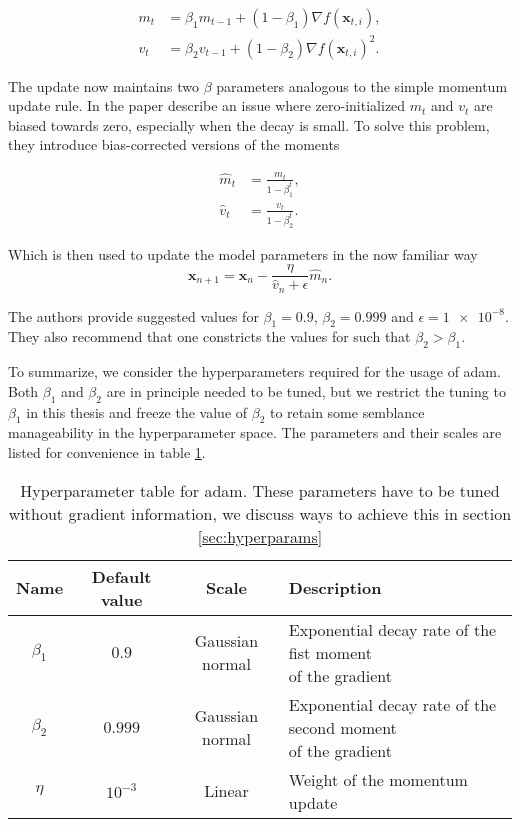 \begin{align}
m_t &= \beta_1 m_{t-1} +(1-\beta_1)\nabla f(\boldsymbol{x}_{t, i}), \\
v_t &= \beta_2 v_{t-1} +(1-\beta_2)\nabla f(\boldsymbol{x}_{t, i})^2.
\end{align}

\noindent The update now maintains two $\beta$ parameters analogous to the simple momentum update rule. In the paper \citet{Kingma2015} describe an issue where zero-initialized $m_t$ and $v_t$ are biased towards zero, especially when the decay is small. To solve this problem, they introduce bias-corrected versions of the moments 

\begin{align}
\hat{m}_t &= \frac{m_t}{1 - \beta_1^t}, \\
\hat{v}_t &= \frac{v_t}{1 - \beta_2^t}.
\end{align}

\noindent Which is then used to update the model parameters in the now familiar way
\begin{equation}\label{eq:adam}
\boldsymbol{x}_{n+1} = \boldsymbol{x}_{n} - \frac{\eta}{\hat{v}_n + \epsilon}\hat{m}_n.
\end{equation}

\noindent The authors provide suggested values for $\beta_1 =0.9 $, $\beta_2 =0.999$ and $\epsilon = \num{1e-8}$. They also recommend that one constricts the values for such that $\beta_2 > \beta_1$. 

To summarize, we consider the hyperparameters required for the usage of adam. Both $\beta_1$ and $\beta_2$ are in principle needed to be tuned, but we restrict the tuning to $\beta_1$ in this thesis and freeze the value of $\beta_2$ to retain some semblance manageability in the hyperparameter space. The parameters and their scales are listed for convenience in table \ref{tab:adam}.

\begin{table}
\begin{tabular}{cccl}
\toprule
Name &Default value & Scale  & Description\\
\midrule
$\beta_1$  & $0.9$ & Gaussian normal & \makecell[l]{Exponential decay rate of the fist moment \\ of the gradient}\\
$\beta_2$  & $0.999$ & Gaussian normal & \makecell[l]{Exponential decay rate of the second moment \\ of the gradient}\\
$\eta$  & $10^{-3}$ & Linear & Weight of the momentum update \\
\bottomrule
\end{tabular}
\caption{Hyperparameter table for adam. These parameters have to be tuned without gradient information, we discuss ways to achieve this in section \ref{sec:hyperparams}}\label{tab:adam}
\end{table}


